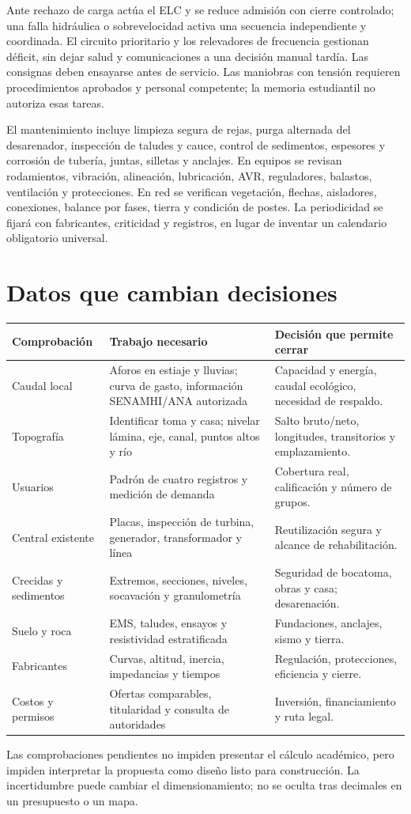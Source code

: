 Ante rechazo de carga actúa el ELC y se reduce admisión con cierre controlado; una falla hidráulica o sobrevelocidad activa una secuencia independiente y coordinada. El circuito prioritario y los relevadores de frecuencia gestionan déficit, sin dejar salud y comunicaciones a una decisión manual tardía. Las consignas deben ensayarse antes de servicio. Las maniobras con tensión requieren procedimientos aprobados y personal competente; la memoria estudiantil no autoriza esas tareas.

El mantenimiento incluye limpieza segura de rejas, purga alternada del desarenador, inspección de taludes y cauce, control de sedimentos, espesores y corrosión de tubería, juntas, silletas y anclajes. En equipos se revisan rodamientos, vibración, alineación, lubricación, AVR, reguladores, balastos, ventilación y protecciones. En red se verifican vegetación, flechas, aisladores, conexiones, balance por fases, tierra y condición de postes. La periodicidad se fijará con fabricantes, criticidad y registros, en lugar de inventar un calendario obligatorio universal.

\section{Datos que cambian decisiones}
\begin{longtable}{L{3.3cm}L{5.8cm}L{4.8cm}}\toprule Comprobación & Trabajo necesario & Decisión que permite cerrar \\ \midrule
Caudal local & Aforos en estiaje y lluvias; curva de gasto, información SENAMHI/ANA autorizada & Capacidad y energía, caudal ecológico, necesidad de respaldo.\\
Topografía & Identificar toma y casa; nivelar lámina, eje, canal, puntos altos y río & Salto bruto/neto, longitudes, transitorios y emplazamiento.\\
Usuarios & Padrón de cuatro registros y medición de demanda & Cobertura real, calificación y número de grupos.\\
Central existente & Placas, inspección de turbina, generador, transformador y línea & Reutilización segura y alcance de rehabilitación.\\
Crecidas y sedimentos & Extremos, secciones, niveles, socavación y granulometría & Seguridad de bocatoma, obras y casa; desarenación.\\
Suelo y roca & EMS, taludes, ensayos y resistividad estratificada & Fundaciones, anclajes, sismo y tierra.\\
Fabricantes & Curvas, altitud, inercia, impedancias y tiempos & Regulación, protecciones, eficiencia y cierre.\\
Costos y permisos & Ofertas comparables, titularidad y consulta de autoridades & Inversión, financiamiento y ruta legal.\\ \bottomrule\end{longtable}
Las comprobaciones pendientes no impiden presentar el cálculo académico, pero impiden interpretar la propuesta como diseño listo para construcción. La incertidumbre puede cambiar el dimensionamiento; no se oculta tras decimales en un presupuesto o un mapa.

